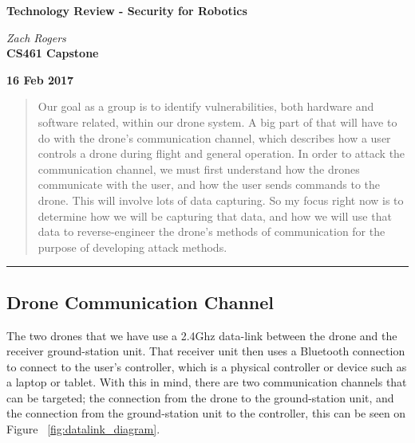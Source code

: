 \documentclass[IEEEtran,letterpaper,10pt,titlepage,draftclsnofoot,onecolumn]{article}
\begin{document}
\begin{titlepage}
  \begin{center}
    \vspace*{1cm}

    \huge
    \textbf{Technology Review - Security for Robotics}
  \vspace{0.5cm}

    \textit{Zach Rogers}\\
  \vspace{0.5cm}
    \vfill
    \large
    \textbf{CS461 Capstone}\\
  \vspace{5mm}

    \textbf{16 Feb 2017}\\

    \vfill
    \end{center}
\end{titlepage}

\begin{abstract}
Our goal as a group is to identify vulnerabilities, both hardware and software related, within our drone system.
A big part of that will have to do with the drone's communication channel, which describes how a user controls a
drone during flight and general operation. In order to attack the communication channel, we must first understand
how the drones communicate with the user, and how the user sends commands to the drone. This will involve lots of
data capturing. So my focus right now is to determine how we will be capturing that data, and how we will use that
data to reverse-engineer the drone's methods of communication for the purpose of developing attack methods.
\end{abstract}

\hrule\vspace{5mm}
\subsection*{Drone Communication Channel}
The two drones that we have use a 2.4Ghz data-link between the drone and the receiver ground-station unit.
That receiver unit then uses a Bluetooth connection to connect to the user's controller, which is a physical controller
or device such as a laptop or tablet.\cite{NazaM2} With this in mind, there are two communication channels that can be
targeted; the connection from the drone to the ground-station unit, and the connection from the ground-station unit
to the controller, this can be seen on Figure ~\ref{fig:datalink_diagram}\cite{NazaM2}.
\end{document}
